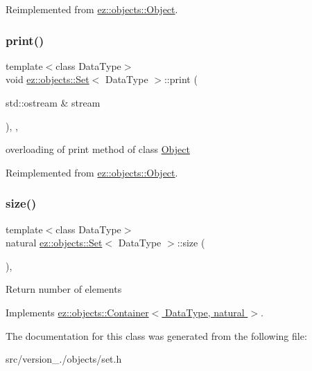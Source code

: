 Reimplemented from \hyperlink{classez_1_1objects_1_1Object_a0fdfe18e6c35d6b0d7e7a01265aded15}{ez\+::objects\+::\+Object}.

\mbox{\label{classez_1_1objects_1_1Set_a6fd40ec895d19ec7ab00cc8c55b505a1}} 
\subsubsection{\texorpdfstring{print()}{print()}}
{\footnotesize\ttfamily template$<$class Data\+Type$>$ \\
void \hyperlink{classez_1_1objects_1_1Set}{ez\+::objects\+::\+Set}$<$ Data\+Type $>$\+::print (\begin{DoxyParamCaption}\item[{std\+::ostream \&}]{stream }\end{DoxyParamCaption})\hspace{0.3cm}{\ttfamily [inline]}, {\ttfamily [override]}, {\ttfamily [virtual]}}

overloading of print method of class \hyperlink{classez_1_1objects_1_1Object}{Object} 

Reimplemented from \hyperlink{classez_1_1objects_1_1Object_a9e20f39a78163f67f000576149d858b3}{ez\+::objects\+::\+Object}.

\mbox{\label{classez_1_1objects_1_1Set_afb546d4097dc6a89b5c114922139619d}} 
\subsubsection{\texorpdfstring{size()}{size()}}
{\footnotesize\ttfamily template$<$class Data\+Type$>$ \\
natural \hyperlink{classez_1_1objects_1_1Set}{ez\+::objects\+::\+Set}$<$ Data\+Type $>$\+::size (\begin{DoxyParamCaption}{ }\end{DoxyParamCaption})\hspace{0.3cm}{\ttfamily [inline]}, {\ttfamily [virtual]}}

Return number of elements 

Implements \hyperlink{classez_1_1objects_1_1Container_affd294810c6c29530d1d1e3c2151ad28}{ez\+::objects\+::\+Container$<$ Data\+Type, natural $>$}.



The documentation for this class was generated from the following file\+:\begin{DoxyCompactItemize}
\item 
src/version\+\_./objects/set.\+h\end{DoxyCompactItemize}
